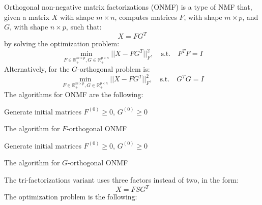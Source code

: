 Orthogonal non-negative matrix factorizations (ONMF) is a type of NMF that, given a matrix $X$ with shape $m \times n$, computes matrices $F$, with shape $m \times p$, and $G$, with shape $n \times p$, such that:
\begin{equation*}
X = FG^T
\end{equation*}
by solving the optimization problem:
\begin{equation*}
\min_{F \in \mathbb{R}^{m \times p}_+, G \in \mathbb{R}^{p \times n}_+} ||X - FG^T||^2_F, \quad \text{s.t.} \quad F^TF = I
\end{equation*}
Alternatively, for the $G$-orthogonal problem is:
\begin{equation*}
\min_{F \in \mathbb{R}^{m \times p}_+, G \in \mathbb{R}^{p \times n}_+} ||X - FG^T||^2_F, \quad \text{s.t.} \quad G^TG = I
\end{equation*}
The algorithms for ONMF are the following:
\vskip 0.7cm
\begin{algorithm}[H]
Generate initial matrices $F^{(0)} \geq 0$, $G^{(0)} \geq 0$\;
\caption{The algorithm for $F$-orthogonal ONMF}
\end{algorithm}
\vskip 0.7cm
\begin{algorithm}[H]
Generate initial matrices $F^{(0)} \geq 0$, $G^{(0)} \geq 0$\;
\caption{The algorithm for $G$-orthogonal ONMF}
\end{algorithm}
\vskip 0.7cm
The tri-factorizations \cite{10.1145/1150402.1150420} variant uses three factors instead of two, in the form:
\begin{equation*}
X = FSG^T
\end{equation*}
The optimization problem is the following:
